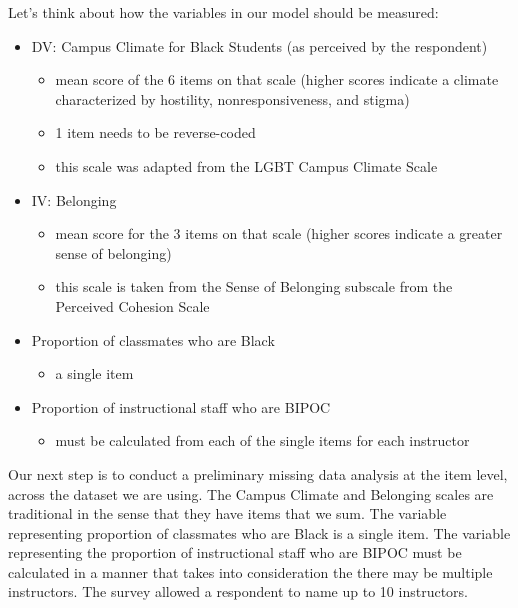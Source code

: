 \documentclass[
  english,
]{book}
\providecommand{\tightlist}{%
  \setlength{\itemsep}{0pt}\setlength{\parskip}{0pt}}
\begin{document}
Let's think about how the variables in our model should be measured:

\begin{itemize}
\tightlist
\item
  DV: Campus Climate for Black Students (as perceived by the respondent)

  \begin{itemize}
  \tightlist
  \item
    mean score of the 6 items on that scale (higher scores indicate a climate characterized by hostility, nonresponsiveness, and stigma)
  \item
    1 item needs to be reverse-coded
  \item
    this scale was adapted from the LGBT Campus Climate Scale \citep{szymanski_perceptions_2020}
  \end{itemize}
\item
  IV: Belonging

  \begin{itemize}
  \tightlist
  \item
    mean score for the 3 items on that scale (higher scores indicate a greater sense of belonging)
  \item
    this scale is taken from the Sense of Belonging subscale from the Perceived Cohesion Scale \citep{bollen_perceived_1990}
  \end{itemize}
\item
  Proportion of classmates who are Black

  \begin{itemize}
  \tightlist
  \item
    a single item
  \end{itemize}
\item
  Proportion of instructional staff who are BIPOC

  \begin{itemize}
  \tightlist
  \item
    must be calculated from each of the single items for each instructor
  \end{itemize}
\end{itemize}

Our next step is to conduct a preliminary missing data analysis at the item level, across the dataset we are using. The Campus Climate and Belonging scales are traditional in the sense that they have items that we sum. The variable representing proportion of classmates who are Black is a single item. The variable representing the proportion of instructional staff who are BIPOC must be calculated in a manner that takes into consideration the there may be multiple instructors. The survey allowed a respondent to name up to 10 instructors.
\end{document}

